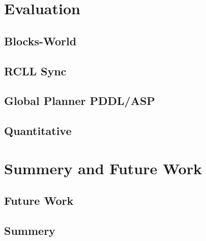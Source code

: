 \documentclass[a4paper,11pt]{article}
\begin{document}
\section{Evaluation}
\subsection{Blocks-World}
\subsection{RCLL Sync}
\subsection{Global Planner PDDL/ASP}
\subsection{Quantitative}


\section{Summery and Future Work}
\subsection{Future Work}
\subsection{Summery}



\end{document}
